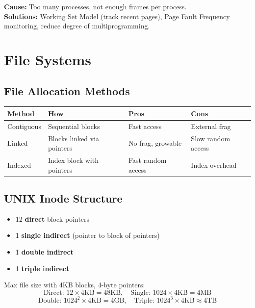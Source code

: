 \documentclass[12pt,a4paper]{article}
\begin{document}
\textbf{Cause:} Too many processes, not enough frames per process.\\
\textbf{Solutions:} Working Set Model (track recent pages), Page Fault Frequency monitoring, reduce degree of multiprogramming.

\section{File Systems}

\subsection{File Allocation Methods}

\begin{center}
\begin{tabular}{@{} l p{4cm} p{3cm} p{3.5cm} @{}}
\toprule
\textbf{Method} & \textbf{How} & \textbf{Pros} & \textbf{Cons} \\
\midrule
Contiguous & Sequential blocks & Fast access & External frag \\
Linked & Blocks linked via pointers & No frag, growable & Slow random access \\
Indexed & Index block with pointers & Fast random access & Index overhead \\
\bottomrule
\end{tabular}
\end{center}

\subsection{UNIX Inode Structure}
\begin{itemize}[leftmargin=*]
    \item 12 \textbf{direct} block pointers
    \item 1 \textbf{single indirect} (pointer to block of pointers)
    \item 1 \textbf{double indirect}
    \item 1 \textbf{triple indirect}
\end{itemize}

Max file size with 4KB blocks, 4-byte pointers:
\[
\text{Direct: } 12 \times 4\text{KB} = 48\text{KB}, \quad \text{Single: } 1024 \times 4\text{KB} = 4\text{MB}
\]
\[
\text{Double: } 1024^2 \times 4\text{KB} = 4\text{GB}, \quad \text{Triple: } 1024^3 \times 4\text{KB} \approx 4\text{TB}
\]
\end{document}
